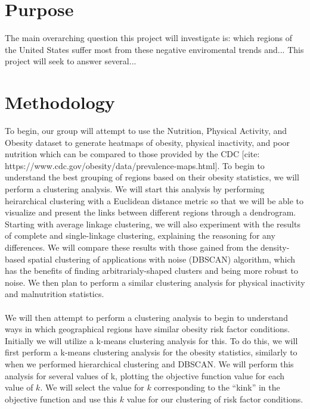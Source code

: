 \documentclass{article}
\begin{document}
\section{Purpose}
\label{purpose}

The main overarching question this project will investigate is: which regions of the United States suffer most from these negative enviromental trends and...
This project will seek to answer several...

\section{Methodology}
\label{methodology}
To begin, our group will attempt to use the Nutrition, Physical Activity, and Obesity dataset to generate heatmaps of obesity, physical inactivity, and poor nutrition which can be compared to those provided by the CDC [cite: https://www.cdc.gov/obesity/data/prevalence-maps.html]. 
To begin to understand the best grouping of regions based on their obesity statistics, we will perform a clustering analysis. 
We will start this analysis by performing heirarchical clustering with a Euclidean distance metric so that we will be able to visualize and present the links between different regions through a dendrogram. 
Starting with average linkage clustering, we will also experiment with the results of complete and single-linkage clustering, explaining the reasoning for any differences. 
We will compare these results with those gained from the density-based spatial clustering of applications with noise (DBSCAN) algorithm, which has the benefits of finding arbitrarialy-shaped clusters and being more robust to noise. 
We then plan to perform a similar clustering analysis for physical inactivity and malnutrition statistics.
\\\\
We will then attempt to perform a clustering analysis to begin to understand ways in which geographical regions have similar obesity risk factor conditions. 
Initially we will utilize a k-means clustering analysis for this. To do this, we will first perform a k-means clustering analysis for the obesity statistics, similarly to when we performed hierarchical clustering and DBSCAN. 
We will perform this analysis for several values of k, plotting the objective function value for each value of $k$. We will select the value for $k$ corresponding to the “kink” in the objective function and use this $k$ value for our clustering of risk factor conditions. 
\end{document}
